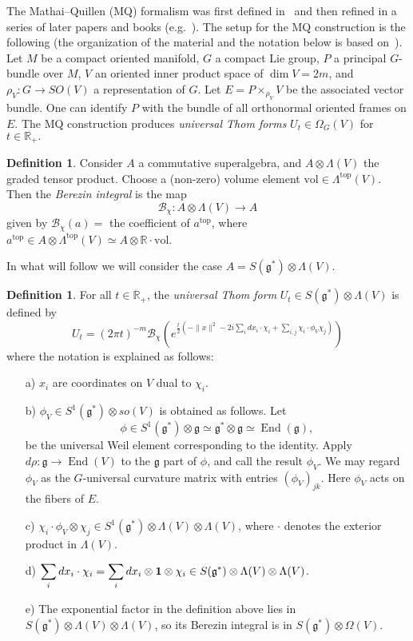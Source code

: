 \documentclass[a4paper,12pt,reqno,sumlimits]{amsart}
\theoremstyle{plain}
\theoremstyle{definition}
\newtheorem{defn}[thm]{Definition}
\newcommand{\R}{{\mathbb R}}
\newcommand{\1}{{\bf 1}}
\newcommand{\g}{{\mathfrak  g}}
\newcommand{\ex}[1]{{e^{#1}}}
\newcommand{\calB}{{\mathcal B}}
\renewcommand{\to}{\longrightarrow}
\newcommand{\End}{\operatorname{End}}
\newcommand{\norm}[1]{\| #1 \|}
\numberwithin{equation}{section}
\begin{document}
The Mathai--Quillen (MQ) formalism was first defined in~\cite{mq} and then
refined in a series of later papers and books (e.g.~\cite{aj}).  The setup
for the MQ construction is the following (the organization of the material
and the notation below is based on~\cite{radu}).  Let $M$ be a compact
oriented manifold, $G$ a compact Lie group, $P$ a principal $G$-bundle over
$M$, $V$ an oriented inner product space of $\dim{V}=2m$, and $\rho_V:G\to
SO(V)$ a representation of $G$.  Let $E=P\times_{\rho_V}V$ be the associated
vector bundle.  One can identify $P$ with the bundle of all orthonormal
oriented frames on $E$.  The MQ construction produces {\em universal Thom
  forms} $U_t\in\Omega_G(V)$ for $t\in\R_+.$
\begin{defn}
  \label{berezin}
  Consider $A$ a commutative superalgebra, and $A\otimes\Lambda(V)$ the
  graded tensor product.  Choose a (non-zero) volume element
  $\text{vol}\in\Lambda^{\text{top}}(V)$. Then the {\em Berezin integral} is
  the map
  $$
  \calB_\chi:A\otimes\Lambda(V)\to A
  $$
  given by $\calB_\chi(a)=$ the coefficient of $a^{\text{top}}$, where
  $a^{\text{top}}\in A\otimes\Lambda^{\text{top}}(V)\simeq
  A\otimes\R\cdot\text{vol}$.
\end{defn}
In what will follow we will consider the case $A=S(\g^*)\otimes\Lambda(V)$.
\begin{defn}
  For all $t\in\R_+$, the {\em universal Thom form} 
  $U_t\in S(\g^*)\otimes\Lambda(V)$ is defined by
  $$
  U_t=(2\pi t)^{-m}\calB_\chi\left(\ex{\frac{t}{2}(-\norm{x}^2
      -2i\sum_i dx_i\cdot\chi_i + \sum_{i,j}\chi_i\cdot\phi_V\chi_j)}\right)
  $$
  where the notation is explained as follows:
  \begin{itemize}
  \item[a)] $x_i$ are coordinates on $V$ dual to $\chi_i$.
  \item[b)] $\phi_V\in S^1(\g^*)\otimes so(V)$ is obtained as follows.
    Let
    $$
    \phi\in S^1(\g^*)\otimes\g\simeq\g^*\otimes\g\simeq\End(\g),
    $$
    be the universal Weil element corresponding to the identity.  Apply
    $d\rho:\g\to\End(V)$ to the $\g$ part of $\phi$, and call the result
    $\phi_V$.  We may regard $\phi_V$ as the $G$-universal curvature matrix
    with entries $(\phi_V)_{jk}$. Here $\phi_V$ acts on the fibers of
    $E$.
  \item[c)] $\chi_i\cdot\phi_V\otimes\chi_j\in
    S^1(\g^*)\otimes\Lambda(V)\otimes\Lambda(V)$, where $\cdot$ denotes the
    exterior product in $\Lambda(V)$.
  \item[d)] $\displaystyle\sum_i dx_i\cdot\chi_i=\displaystyle\sum_i
    dx_i\otimes\1\otimes\chi_i\in S(\g^*)\otimes\Lambda(V)\otimes\Lambda(V)$.
  \item[e)] The exponential factor in the definition above lies in
    $S(\g^*)\otimes\Lambda(V)\otimes\Lambda(V)$, so its Berezin integral is
    in $S(\g^*)\otimes\Omega(V).$
  \end{itemize}
\end{defn}
\end{document}
